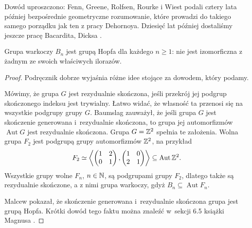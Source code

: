 Dowód uproszczono: Fenn, Greene, Rolfsen, Rourke i Wiest \cite{fenn1999} podali cztery lata później bezpośrednie geometryczne rozumowanie, które prowadzi do takiego samego porządku jak ten z pracy Dehornoya.
%
%
%
%
%
Dziesięć lat później dostaliśmy jeszcze pracę Bacardita, Dicksa \cite{bacardit2009}.
%
%

\begin{proposition}
    Grupa warkoczy $B_n$ jest grupą Hopfa dla każdego $n \ge 1$: nie jest izomorficzna z żadnym ze swoich właściwych ilorazów.
\end{proposition}

\begin{proof}
    Podręcznik \cite{magnus1966} dobrze wyjaśnia różne idee stojące za dowodem, który podamy.

    Mówimy, że grupa $G$ jest rezydualnie skończona, jeśli przekrój jej podgrup skończonego indeksu jest trywialny.
    Łatwo widać, że własność ta przenosi się na wszystkie podgrupy grupy $G$.
    Baumslag zauważył, że jeśli grupa $G$ jest skończenie generowana i~rezydualnie skończona, to grupa jej automorfizmów $\operatorname{Aut} G$ jest rezydualnie skończona.
    Grupa $G = \mathbb Z^2$ spełnia te założenia.
    Wolna grupa $F_2$ jest podgrupą grupy automorfizmów $\mathbb Z^2$, na przykład
    \begin{equation}
        F_2 \simeq \left\langle
        \begin{pmatrix}
            1 & 2 \\
            0 & 1
        \end{pmatrix},
        \begin{pmatrix}
            1 & 0 \\
            2 & 1
        \end{pmatrix}
        \right\rangle \subseteq \operatorname{Aut} \mathbb Z^2.
    \end{equation}
    Wszystkie grupy wolne $F_n$, $n \in \mathbb N$, są podgrupami grupy $F_2$, dlatego także są rezydualnie skończone, a z nimi grupa warkoczy, gdyż $B_n \subseteq \operatorname{Aut} F_n$.

    Malcew pokazał, że skończenie generowana i~rezydualnie skończona grupa jest grupą Hopfa.
%
    Krótki dowód tego faktu można znaleźć w~sekcji 6.5 książki Magnusa \cite{magnus1966}.
%
\end{proof}

